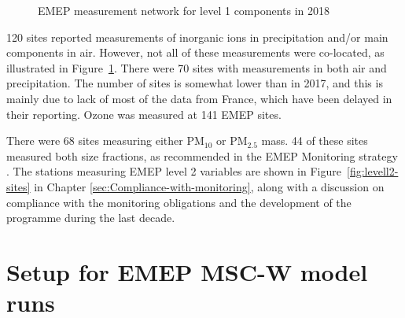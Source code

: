 \begin{figure}[h!]
 \centering
\caption{\label{fig:EMEP-measurement-network}EMEP measurement network for level 1 components in 2018}
\end{figure}

120 sites reported measurements of inorganic ions in precipitation and/or main components in air. However, not all of these measurements were co-located, as illustrated in Figure~\ref{fig:EMEP-measurement-network}. There were 70 sites with measurements in both air and precipitation. The number of sites is somewhat lower than in 2017, and this is mainly due to lack of most of the data from France, which have been delayed in their reporting. Ozone was measured at 141 EMEP sites.

There were 68 sites measuring either PM$_{10}$ or PM$_{2.5}$ mass. 44 of these sites measured both size fractions, as recommended in the EMEP Monitoring strategy \citep{MonStrat2019}. The stations measuring EMEP level 2 variables are shown in Figure~\ref{fig:levell2-sites} in Chapter \ref{sec:Compliance-with-monitoring}, along with a discussion on compliance with the monitoring obligations and the development of the programme during the last decade.

\section{Setup for EMEP MSC-W model runs}
\label{Mod_2018}

